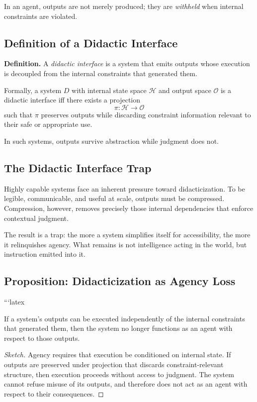 \documentclass[12pt]{article}
\begin{document}
In an agent, outputs are not merely produced; they are \emph{withheld} when internal constraints are violated.

\subsection{Definition of a Didactic Interface}

\textbf{Definition.}  
A \emph{didactic interface} is a system that emits outputs whose execution is decoupled from the internal constraints that generated them.

Formally, a system $D$ with internal state space $\mathcal{H}$ and output space $\mathcal{O}$ is a didactic interface iff there exists a projection
\[
\pi : \mathcal{H} \to \mathcal{O}
\]
such that $\pi$ preserves outputs while discarding constraint information relevant to their safe or appropriate use.

In such systems, outputs survive abstraction while judgment does not.

\subsection{The Didactic Interface Trap}

Highly capable systems face an inherent pressure toward didacticization. To be legible, communicable, and useful at scale, outputs must be compressed. Compression, however, removes precisely those internal dependencies that enforce contextual judgment.

The result is a trap: the more a system simplifies itself for accessibility, the more it relinquishes agency. What remains is not intelligence acting in the world, but instruction emitted into it.

\subsection{Proposition: Didacticization as Agency Loss}

```latex
\begin{proposition}
If a system's outputs can be executed independently of the internal constraints that generated them, then the system no longer functions as an agent with respect to those outputs.
\end{proposition}

\begin{proof}[Sketch]
Agency requires that execution be conditioned on internal state. If outputs are preserved under projection that discards constraint-relevant structure, then execution proceeds without access to judgment. The system cannot refuse misuse of its outputs, and therefore does not act as an agent with respect to their consequences.
\end{proof}
\end{document}
